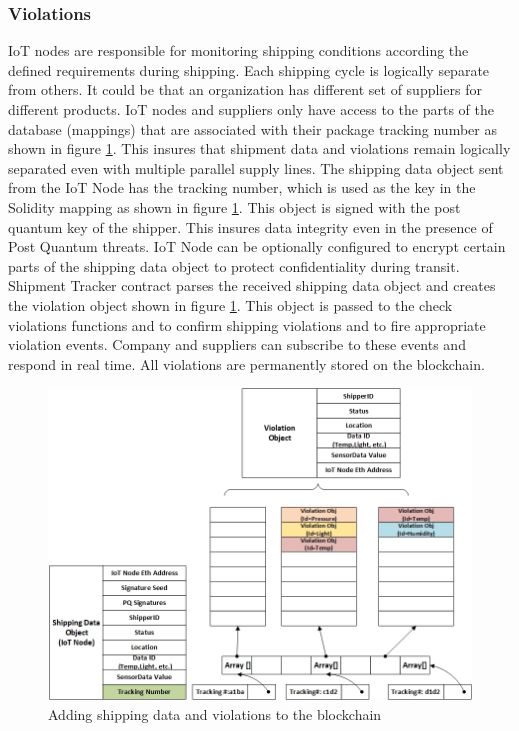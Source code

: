 \subsubsection{Violations} \label{SV} 
IoT nodes are responsible for monitoring shipping conditions according the defined requirements during shipping. Each shipping cycle is logically separate from others. It could be that an organization has different set of suppliers for different products. IoT nodes and suppliers only have access to the parts of the database (mappings) that are associated with their package tracking number as shown in figure \ref{fig:violation-impl}. This insures that shipment data and violations remain logically separated even with multiple parallel supply lines. The shipping data object sent from the IoT Node has the tracking number, which is used as the key in the Solidity mapping as shown in figure \ref{fig:violation-impl}. This object is signed with the post quantum key of the shipper. This insures data integrity even in the presence of Post Quantum threats. IoT Node can be optionally configured to encrypt certain parts of the shipping data object to protect confidentiality during transit. Shipment Tracker contract parses the received shipping data object and creates the violation object shown in figure \ref{fig:violation-impl}. This object is passed to the check violations functions and to confirm shipping violations and to fire appropriate violation events. Company and suppliers can subscribe to these events and respond in real time. All violations are permanently stored on the blockchain.

\begin{figure}[h]
	\centering
    \includegraphics[width=160mm,scale=1]{figs/violation-impl}
	\caption{Adding shipping data and violations to the blockchain}
	\label{fig:violation-impl} 
\end{figure} 

